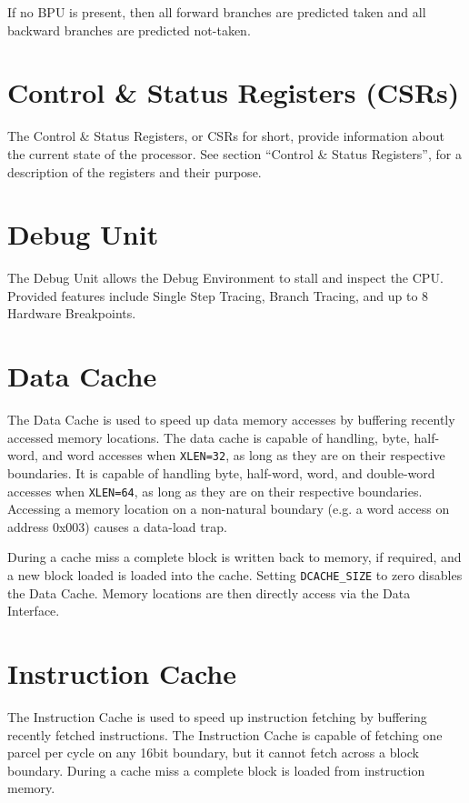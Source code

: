 If no BPU is present, then all forward branches are predicted taken and
all backward branches are predicted not-taken.

\section{Control \& Status Registers (CSRs)} \label{control-status-registers-csrs}

The Control \& Status Registers, or CSRs for short, provide information
about the current state of the processor. See section ``Control \&
Status Registers'', for a description of the registers and their
purpose.

\section{Debug Unit} \label{debug-unit}

The Debug Unit allows the Debug Environment to stall and inspect the
CPU. Provided features include Single Step Tracing, Branch Tracing, and
up to 8 Hardware Breakpoints.

\section{Data Cache} \label{data-cache}

The Data Cache is used to speed up data memory accesses by buffering
recently accessed memory locations. The data cache is capable of
handling, byte, half-word, and word accesses when \texttt{XLEN=32}, as long as
they are on their respective boundaries. It is capable of handling byte,
half-word, word, and double-word accesses when \texttt{XLEN=64}, as long as they
are on their respective boundaries. Accessing a memory location on a
non-natural boundary (e.g. a word access on address 0x003) causes a
data-load trap.

During a cache miss a complete block is written back to memory, if
required, and a new block loaded is loaded into the cache. Setting 
\texttt{DCACHE\_SIZE} to zero disables the Data Cache. Memory locations
are then directly access via the Data Interface.

\section{Instruction Cache}\label{instruction-cache}

The Instruction Cache is used to speed up instruction fetching by
buffering recently fetched instructions. The Instruction Cache is
capable of fetching one parcel per cycle on any 16bit boundary, but it
cannot fetch across a block boundary. During a cache miss a complete
block is loaded from instruction memory.

